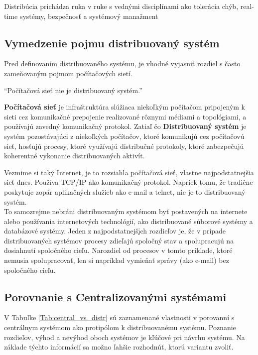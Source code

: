 Distribúcia prichádza ruka v ruke s vednými disciplínami ako tolerácia chýb, real-time systémy, bezpečnosť a systémový manažment

\subsection{Vymedzenie pojmu distribuovaný systém}

Pred definovaním distribuovaného systému, je vhodné vyjasniť rozdiel s často zameňovaným pojmom počítačových sietí.

\begin{displayquote}
	``Počítačová sieť nie je distribuovaný systém.''
\end{displayquote}

\textbf{Počítačová sieť} je infraštruktúra slúžiaca niekoľkým počítačom  pripojeným k sieti cez komunikačné prepojenie realizované rôznymi médiami a topológiami, a používajú zavedný komunikačný protokol.
Zatiaľ čo \textbf{Distribuovaný systém} je systém pozostávajúci z niekoľkých počítačov, ktoré komunikujú cez počítačovú sieť, hosťujú procesy, ktoré využívajú distribučné protokoly, ktoré zabezpečujú koherentné vykonanie distribuovaných aktivít. \\

\begin{exmpl}
	Vezmime si taký Internet, je to rozsiahla počítačová sieť, vlastne najpodstatnejšia sieť dnes. Používa TCP/IP ako komunikačný protokol.
	Napriek tomu, že tradične poskytuje zopár aplikačných služieb ako e-mail a telnet, nie je to distribuovaný systém. \\
	
	To samozrejme nebráni distribuovaným systémom byť postavených na internete alebo používania internetových technológií, ako distribuované súborové systémy a databázové systémy.
	Jeden z najpodstatnejšįch rozdieľov je, že v prípade distribuovaných systémov procesy zdieľajú spoločný stav a spolupracujú na dosiahnutí spoločného cieľu. Narozdiel od procesov v tomto príklade, ktoré nemusia spolupracovať, len si napríklad vymieňať správy (ako e-mail) bez spoločného cieľu.
\end{exmpl}

\subsection{Porovnanie s Centralizovanými systémami}

V Tabuľke \ref{Tab:central_vs_distr} sú zaznamenané vlastnosti v porovanní s centrálnym systémom ako protipólom k distribuovanému systému. Poznanie rozdieľov, výhod a nevýhod oboch systémov je kľúčové pri návrhu systému. Na základe týchto informácií sa možno ľahšie rozhodnúť, ktorú variantu zvoliť.

